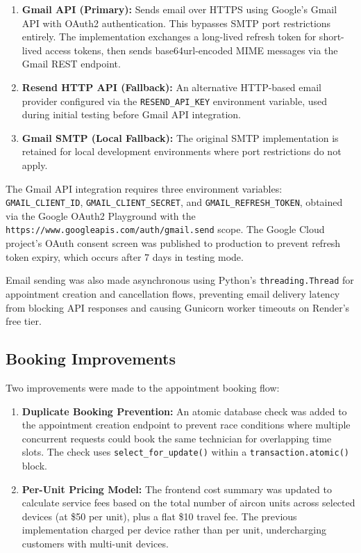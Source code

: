 \documentclass[conference]{IEEEtran}
\begin{document}
\begin{enumerate}
    \item \textbf{Gmail API (Primary):} Sends email over HTTPS using Google's Gmail API with OAuth2 authentication. This bypasses SMTP port restrictions entirely. The implementation exchanges a long-lived refresh token for short-lived access tokens, then sends base64url-encoded MIME messages via the Gmail REST endpoint.
    \item \textbf{Resend HTTP API (Fallback):} An alternative HTTP-based email provider configured via the \texttt{RESEND\_API\_KEY} environment variable, used during initial testing before Gmail API integration.
    \item \textbf{Gmail SMTP (Local Fallback):} The original SMTP implementation is retained for local development environments where port restrictions do not apply.
\end{enumerate}

The Gmail API integration requires three environment variables: \texttt{GMAIL\_CLIENT\_ID}, \texttt{GMAIL\_CLIENT\_SECRET}, and \texttt{GMAIL\_REFRESH\_TOKEN}, obtained via the Google OAuth2 Playground with the \texttt{https://www.googleapis.com/\allowbreak auth/gmail.send} scope. The Google Cloud project's OAuth consent screen was published to production to prevent refresh token expiry, which occurs after 7 days in testing mode.

Email sending was also made asynchronous using Python's \texttt{threading.Thread} for appointment creation and cancellation flows, preventing email delivery latency from blocking API responses and causing Gunicorn worker timeouts on Render's free tier.

\subsection{Booking Improvements}

Two improvements were made to the appointment booking flow:

\begin{enumerate}
    \item \textbf{Duplicate Booking Prevention:} An atomic database check was added to the appointment creation endpoint to prevent race conditions where multiple concurrent requests could book the same technician for overlapping time slots. The check uses \texttt{select\_for\_update()} within a \texttt{transaction.atomic()} block.
    \item \textbf{Per-Unit Pricing Model:} The frontend cost summary was updated to calculate service fees based on the total number of aircon units across selected devices (at \$50 per unit), plus a flat \$10 travel fee. The previous implementation charged per device rather than per unit, undercharging customers with multi-unit devices.
\end{enumerate}
\end{document}
